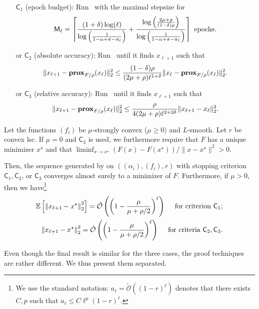 \begin{algorithm}[]
{\begin{itemize}
    \item[] $\mathsf{C}_1$ (epoch budget): Run \spyI~with the maximal stepsize for
    $$  \displaystyle \mathsf{M}_\ell = \left\lceil \frac{ (1+\delta) \log(\ell)}{\log\left( \frac{1}{1-\alpha+\pi - \pi_\ell} \right)} + \frac{\log\left(\frac{2 \mu+\rho}{(1-\delta)\rho}\right)}{\log\left( \frac{1}{1-\alpha+\pi - \pi_\ell} \right)} \right\rceil \text{ epochs.}$$
    \item[or] $\mathsf{C}_2$ (absolute accuracy):  Run \spyI~until it finds $x_{\ell+1}$ such that  
    $$  \|x_{\ell+1} -  \mathbf{prox}_{F/\rho}(x_\ell)\|^2_2 \leq \frac{(1-\delta)\rho}{(2\mu+\rho) \ell^{1+\delta}} \|x_{\ell} -  \mathbf{prox}_{F/\rho}(x_\ell)\|^2_2  .$$ 
    \item[or] $\mathsf{C}_3$ (relative accuracy):  Run \spyI~until it finds $x_{\ell+1}$ such that  
    $$  \|x_{\ell+1} -  \mathbf{prox}_{F/\rho}(x_\ell)\|^2_2 \leq \frac{\rho}{4(2\mu+\rho) \ell^{2+2\delta}} \|x_{\ell+1} -  x_\ell \|^2_2  .$$ 
\end{itemize}
}
\end{algorithm}

\begin{theorem} 
\label{th:reco}
Let the functions $(f_i)$ be $\mu$-strongly convex ($\mu\geq0$) and $L$-smooth. Let $r$ be convex lsc. If $\mu=0$ and $\mathsf{C}_3$ is used, we furthermore require that $F$ has a unique minimizer $x^\star$ and that $\liminf_{x\to x^\star} (F(x)-F(x^\star))/\|x-x^\star\|^2 > 0$.

Then, the sequence generated by \recoalgo on $((\alpha_i),(f_i),r)$ with stopping criterion $\mathsf{C}_1, \mathsf{C}_2$, or $\mathsf{C}_3$ converges almost surely to a minimizer of $F$.
Furthermore, if $\mu>0$, then we have\footnote{We use the standard notation: $a_\ell = \tilde{\mathcal{O}} ( (1-r)^\ell)$ denotes that there exists $C,p$ such that $ a_\ell \leq C \ell^p (1-r)^\ell $. } 
      \begin{align*}
        \mathbb{E} \left[   \left\|x_{\ell+1} - x^\star  \right\|^2_2 \right] = \tilde{\mathcal{O}} \left( \left( 1 - \frac{{\mu }}{\mu + {\rho }/2} \right)^\ell \right) \quad\text{ for criterion } \mathsf{C}_1; \\
      \left\|x_{\ell+1} - x^\star  \right\|^2_2  = \tilde{\mathcal{O}} \left( \left( 1 - \frac{{\mu }}{\mu + {\rho }/2}  \right)^\ell \right)  \quad\text{ for criteria } \mathsf{C}_2, \mathsf{C}_3.
        \end{align*}
\end{theorem}

Even though the final result is similar for the three cases, the proof techniques are rather different. We thus present them separated.
